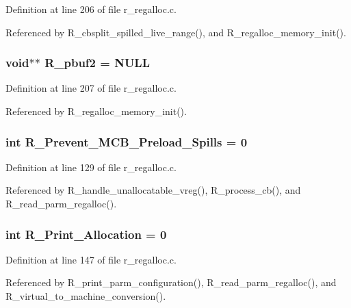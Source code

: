 Definition at line 206 of file r\_\-regalloc.c.

Referenced by R\_\-cbsplit\_\-spilled\_\-live\_\-range(), and R\_\-regalloc\_\-memory\_\-init().
\subsubsection{\setlength{\rightskip}{0pt plus 5cm}void$\ast$$\ast$ \bf{R\_\-pbuf2} = \bf{NULL}}\label{r__regalloc_8c_bf8ecc44bcf4abdb7009ae2a450dc33d}




Definition at line 207 of file r\_\-regalloc.c.

Referenced by R\_\-regalloc\_\-memory\_\-init().
\subsubsection{\setlength{\rightskip}{0pt plus 5cm}int \bf{R\_\-Prevent\_\-MCB\_\-Preload\_\-Spills} = 0}\label{r__regalloc_8c_524ba9bc74fe12c1750b3b0af8b451cf}




Definition at line 129 of file r\_\-regalloc.c.

Referenced by R\_\-handle\_\-unallocatable\_\-vreg(), R\_\-process\_\-cb(), and R\_\-read\_\-parm\_\-regalloc().
\subsubsection{\setlength{\rightskip}{0pt plus 5cm}int \bf{R\_\-Print\_\-Allocation} = 0}\label{r__regalloc_8c_5fc9cc940655d6f372ab7f78f935f2ea}




Definition at line 147 of file r\_\-regalloc.c.

Referenced by R\_\-print\_\-parm\_\-configuration(), R\_\-read\_\-parm\_\-regalloc(), and R\_\-virtual\_\-to\_\-machine\_\-conversion().
